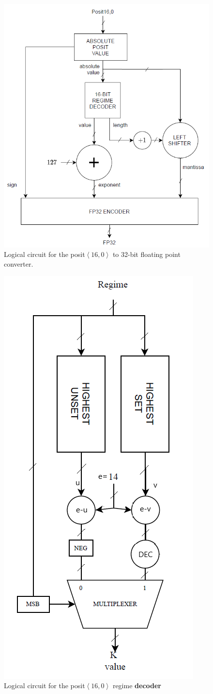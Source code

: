 \begin{figure}
    \centering
    \includegraphics[width=0.5\linewidth]{img/p16_fp32.PNG}
    \caption{Logical circuit for the posit$\left<16,0\right>$ to 32-bit floating point converter.}
    \label{fig:p16_fp32_circ}
\end{figure}

\begin{figure}
    \centering
    \includegraphics[width=0.56\linewidth]{img/regime_decoder.PNG}
    \caption{Logical circuit for the posit$\left<16,0\right>$ regime \textbf{decoder}}
    \label{fig:fp_exp_reg_decoder}
\end{figure}


